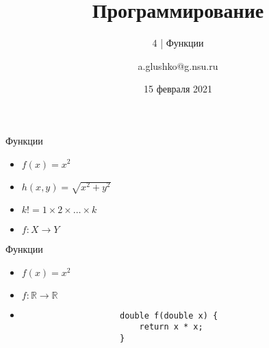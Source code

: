 \documentclass[aspectratio=169,14pt]{beamer}
\title{Программирование}
\subtitle{4 | Функции}
\author{a.glushko@g.nsu.ru}
\date{15 февраля 2021}
\begin{document}
    \begin{frame}
        \titlepage
    \end{frame}

    \begin{frame}{Функции}
        \begin{itemize}
            \item $f(x) = x^2$
            \item $h(x, y) = \sqrt{x^2 + y^2}$
            \item $k! = 1 \times 2 \times \dots \times k$
            \item<2> $f: X \rightarrow Y$
        \end{itemize}
    \end{frame}

    \begin{frame}[fragile]{Функции}
        \begin{itemize}
            \item $f(x) = x^2$
            \item $f: \mathbb{R} \rightarrow \mathbb{R}$
            \item<2->
                \begin{lstlisting}
                    double f(double x) {
                        return x * x;
                    }
                \end{lstlisting}
        \end{itemize}
    \end{frame}
\end{document}
